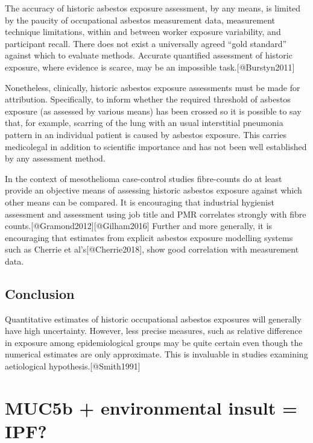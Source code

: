 \documentclass[
]{article}
\begin{document}
The accuracy of historic asbestos exposure assessment, by any means, is
limited by the paucity of occupational asbestos measurement data,
measurement technique limitations, within and between worker exposure
variability, and participant recall. There does not exist a universally
agreed ``gold standard'' against which to evaluate methods. Accurate
quantified assessment of historic exposure, where evidence is scarce,
may be an impossible task.{[}@Burstyn2011{]}

Nonetheless, clinically, historic asbestos exposure assessments must be
made for attribution. Specifically, to inform whether the required
threshold of asbestos exposure (as assessed by various means) has been
crossed so it is possible to say that, for example, scarring of the lung
with an usual interstitial pneumonia pattern in an individual patient is
caused by asbestos exposure. This carries medicolegal in addition to
scientific importance and has not been well established by any
assessment method.

In the context of mesothelioma case-control studies fibre-counts do at
least provide an objective means of assessing historic asbestos exposure
against which other means can be compared. It is encouraging that
industrial hygienist assessment and assessment using job title and PMR
correlates strongly with fibre
counts.{[}@Gramond2012{]}{[}@Gilham2016{]} Further and more generally,
it is encouraging that estimates from explicit asbestos exposure
modelling systems such as Cherrie et al's{[}@Cherrie2018{]}, show good
correlation with measurement data.

\hypertarget{conclusion-2}{%
\subsection{Conclusion}\label{conclusion-2}}

Quantitative estimates of historic occupational asbestos exposures will
generally have high uncertainty. However, less precise measures, such as
relative difference in exposure among epidemiological groups may be
quite certain even though the numerical estimates are only approximate.
This is invaluable in studies examining aetiological
hypothesis.{[}@Smith1991{]}

\hypertarget{muc5b-environmental-insult-ipf}{%
\section{MUC5b + environmental insult =
IPF?}\label{muc5b-environmental-insult-ipf}}
\end{document}
